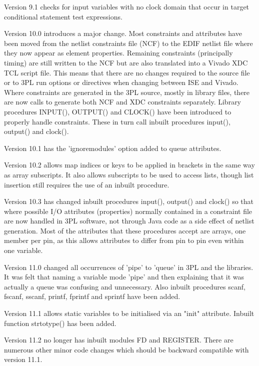	Version 9.1 checks for input variables with no clock domain that occur
	in target conditional statement test expressions.

        Version 10.0 introduces a major change. Most constraints and attributes
        have been moved from the netlist constraints file (NCF) to the
        EDIF netlist file where they now appear as element properties. Remaining
        constraints (principally timing) are still written to the NCF but
        are also translated into a Vivado XDC TCL script file. This means that
        there are no changes required to the source file or to 3PL run options
        or directives when changing between ISE and Vivado. Where constraints
        are generated in the 3PL source, mostly in library files, there are now
        calls to generate both NCF and XDC constraints separately. Library
        procedures INPUT(), OUTPUT() and CLOCK() have been introduced to
        properly handle constraints. These in turn call inbuilt procedures input(),
        output() and clock().

        Version 10.1 has the 'ignoremodules' option added to queue attributes.

        Version 10.2 allows map indices or keys to be applied in brackets in the
        same way as array subscripts. It also allows subscripts to be used to
        access lists, though list insertion still requires the use of an inbuilt
        procedure.

        Version 10.3 has changed inbuilt procedures input(), output() and clock()
        so that where possible I/O attributes (properties) normally contained in
        a constraint file are now handled in 3PL software, not through Java code
        as a side effect of netlist generation. Most of the attributes that these
        procedures accept are arrays, one member per pin, as this allows attributes
        to differ from pin to pin even within one variable.

        Version 11.0 changed all occurrences of 'pipe' to 'queue' in 3PL and
        the libraries. It was felt that naming a variable mode 'pipe' and then
        explaining that it was actually a queue was confusing and unnecessary.
        Also inbuilt procedures scanf, fscanf, sscanf, printf, fprintf and
        sprintf have been added.

        Version 11.1 allows static variables to be initialised via an "init"
        attribute. Inbuilt function strtotype() has been added.

        Version 11.2 no longer has inbuilt modules FD and REGISTER. There
        are numerous other minor code changes which should be backward
        compatible with version 11.1.

